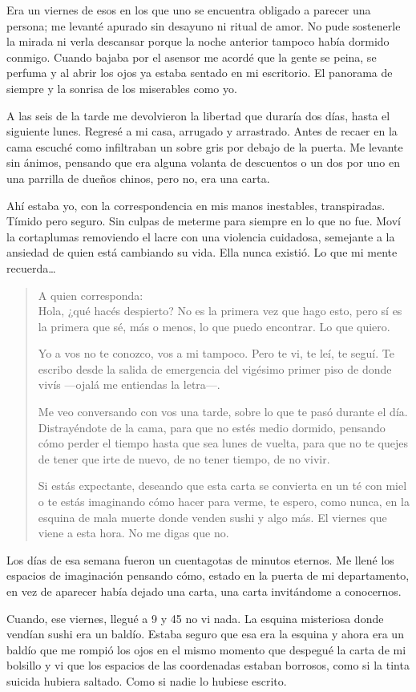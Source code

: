 
Era un viernes de esos en los que uno se encuentra obligado a parecer una
persona; me levanté apurado sin desayuno ni ritual de amor. No pude sostenerle 
la mirada ni verla descansar porque la noche anterior tampoco había dormido 
conmigo. Cuando bajaba por el asensor me acordé que la gente se peina, se perfuma
y al abrir los ojos ya estaba sentado en mi escritorio. El panorama
de siempre y la sonrisa de los miserables como yo.

A las seis de la tarde me devolvieron la libertad que duraría dos días, hasta
el siguiente lunes. Regresé a mi casa, arrugado y arrastrado.  Antes de recaer
en la cama escuché como infiltraban un sobre gris por debajo de la puerta. Me 
levante sin ánimos, pensando que era alguna volanta de descuentos o un dos por
uno en una parrilla de dueños chinos, pero no, era una carta.

Ahí estaba yo, con la correspondencia en mis manos inestables, transpiradas.
Tímido pero seguro. Sin culpas de meterme para siempre en lo que no fue. 
Moví la cortaplumas removiendo el lacre con una violencia cuidadosa,
semejante a la ansiedad de quien está cambiando su vida. Ella nunca existió.
Lo que mi mente recuerda\ldots\newline

\begin{quotation}
\noindent
A quien corresponda:\\

Hola, ¿qué hacés despierto? No es la primera vez que hago esto, pero sí es la
primera que sé, más o menos, lo que puedo encontrar. Lo que quiero.

Yo a vos no te conozco, vos a mi tampoco. Pero te vi, te leí, te seguí. Te 
escribo desde la salida de emergencia del vigésimo primer piso de donde vivís
---ojalá me entiendas la letra---.

Me veo conversando con vos una tarde, sobre lo que te pasó durante el día. 
Distrayéndote de la cama, para que no estés medio dormido, pensando cómo perder
el tiempo hasta que sea lunes de vuelta, para que no te quejes de tener que
irte de nuevo, de no tener tiempo, de no vivir.

Si estás expectante, deseando que esta carta se convierta en un té con miel o
te estás imaginando cómo hacer para verme, te espero, como nunca, en la esquina
de mala muerte donde venden sushi y algo más. El viernes que viene a esta hora.
No me digas que no.
\end{quotation}

Los días de esa semana fueron un cuentagotas de minutos eternos. Me llené los
espacios de imaginación pensando cómo, estado en la puerta de mi departamento, 
en vez de aparecer había dejado una carta, una carta invitándome a conocernos.

Cuando, ese viernes, llegué a 9 y 45 no vi nada. La esquina misteriosa donde
vendían sushi era un baldío. Estaba seguro que esa era la esquina y ahora era
un baldío que me rompió los ojos en el mismo momento que despegué la carta de 
mi bolsillo y vi que los espacios de las coordenadas estaban borrosos, como si
la tinta suicida hubiera saltado. Como si nadie lo hubiese escrito.

